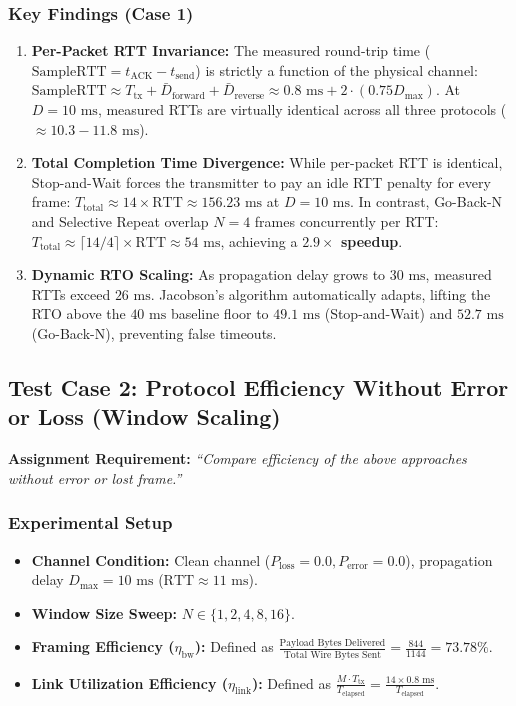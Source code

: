 \documentclass[11pt,a4paper]{article}
\begin{document}
\subsubsection{Key Findings (Case 1)}
\begin{enumerate}
    \item \textbf{Per-Packet RTT Invariance:} The measured round-trip time ($\text{SampleRTT} = t_{\text{ACK}} - t_{\text{send}}$) is strictly a function of the physical channel: $\text{SampleRTT} \approx T_{\text{tx}} + \bar{D}_{\text{forward}} + \bar{D}_{\text{reverse}} \approx 0.8\text{ ms} + 2 \cdot (0.75 D_{\max})$. At $D = 10\text{ ms}$, measured RTTs are virtually identical across all three protocols ($\approx 10.3 - 11.8\text{ ms}$).
    \item \textbf{Total Completion Time Divergence:} While per-packet RTT is identical, Stop-and-Wait forces the transmitter to pay an idle RTT penalty for every frame: $T_{\text{total}} \approx 14 \times \text{RTT} \approx 156.23\text{ ms}$ at $D = 10\text{ ms}$. In contrast, Go-Back-N and Selective Repeat overlap $N=4$ frames concurrently per RTT: $T_{\text{total}} \approx \lceil 14/4 \rceil \times \text{RTT} \approx 54\text{ ms}$, achieving a \textbf{$2.9\times$ speedup}.
    \item \textbf{Dynamic RTO Scaling:} As propagation delay grows to $30\text{ ms}$, measured RTTs exceed $26\text{ ms}$. Jacobson's algorithm automatically adapts, lifting the RTO above the $40\text{ ms}$ baseline floor to $49.1\text{ ms}$ (Stop-and-Wait) and $52.7\text{ ms}$ (Go-Back-N), preventing false timeouts.
\end{enumerate}

\FloatBarrier
\subsection{Test Case 2: Protocol Efficiency Without Error or Loss (Window Scaling)}
\textbf{Assignment Requirement:} \textit{``Compare efficiency of the above approaches without error or lost frame.''}

\subsubsection{Experimental Setup}
\begin{itemize}
    \item \textbf{Channel Condition:} Clean channel ($P_{\text{loss}} = 0.0, P_{\text{error}} = 0.0$), propagation delay $D_{\max} = 10\text{ ms}$ ($\text{RTT} \approx 11\text{ ms}$).
    \item \textbf{Window Size Sweep:} $N \in \{1, 2, 4, 8, 16\}$.
    \item \textbf{Framing Efficiency ($\eta_{\text{bw}}$):} Defined as $\frac{\text{Payload Bytes Delivered}}{\text{Total Wire Bytes Sent}} = \frac{844}{1144} = 73.78\%$.
    \item \textbf{Link Utilization Efficiency ($\eta_{\text{link}}$):} Defined as $\frac{M \cdot T_{\text{tx}}}{T_{\text{elapsed}}} = \frac{14 \times 0.8\text{ ms}}{T_{\text{elapsed}}}$.
\end{itemize}
\end{document}
